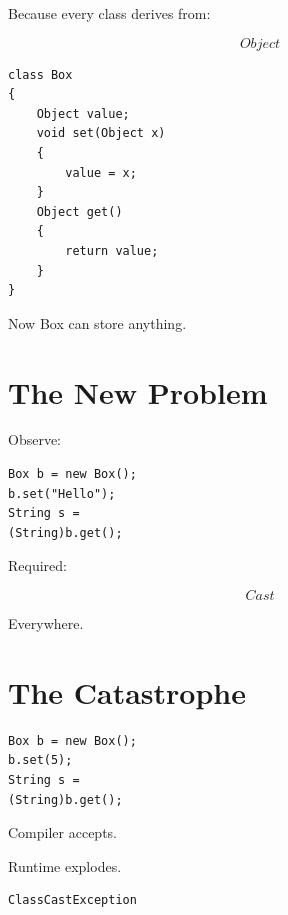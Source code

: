 \documentclass[11pt,a4paper]{book}
\begin{document}
Because every class derives from:

\[
Object
\]


\begin{verbatim}
class Box
{
    Object value;
    void set(Object x)
    {
        value = x;
    }
    Object get()
    {
        return value;
    }
}
\end{verbatim}


Now Box can store anything.


\section{The New Problem}

Observe:

\begin{verbatim}
Box b = new Box();
b.set("Hello");
String s =
(String)b.get();
\end{verbatim}


Required:

\[
Cast
\]


Everywhere.


\section{The Catastrophe}

\begin{verbatim}
Box b = new Box();
b.set(5);
String s =
(String)b.get();
\end{verbatim}


Compiler accepts.


Runtime explodes.


\begin{verbatim}
ClassCastException
\end{verbatim}
\end{document}
